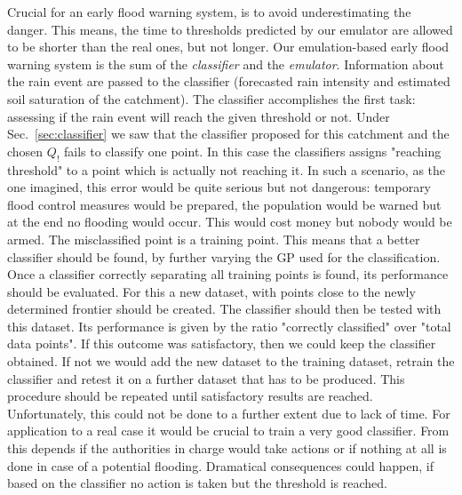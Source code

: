 Crucial for an early flood warning system, is to avoid underestimating the danger.
This means, the time to thresholds predicted by our emulator are allowed to be shorter than the real ones, but not longer.
Our emulation-based early flood warning system is the sum of the \emph{classifier} and the \emph{emulator}.
Information about the rain event are passed to the classifier (forecasted rain intensity and estimated soil saturation of the catchment).
The classifier accomplishes the first task: assessing if the rain event will reach the given threshold or not.
Under Sec.~\ref{sec:classifier} we saw that the classifier proposed for this catchment and the chosen $Q_!$ fails to classify one point.
In this case the classifiers assigns "reaching threshold" to a point which is actually not reaching it.
In such a scenario, as the one imagined, this error would be quite serious but not dangerous: temporary flood control measures would be prepared, the population would be warned but at the end no flooding would occur.
This would cost money but nobody would be armed.
The misclassified point is a training point.
This means that a better classifier should be found, by further varying the GP used for the classification.
Once a classifier correctly separating all training points is found, its performance should be evaluated.
For this a new dataset, with points close to the newly determined frontier should be created.
The classifier should then be tested with this dataset.
Its performance is given by the ratio "correctly classified" over "total data points".
If this outcome was satisfactory, then we could keep the classifier obtained.
If not we would add the new dataset to the training dataset, retrain the classifier and retest it on a further dataset that has to be produced.
This procedure should be repeated until satisfactory results are reached.
Unfortunately, this could not be done to a further extent due to lack of time.
For application to a real case it would be crucial to train a very good classifier.
From this depends if the authorities in charge would take actions or if nothing at all is done in case of a potential flooding.
Dramatical consequences could happen, if based on the classifier no action is taken but the threshold is reached.\\

